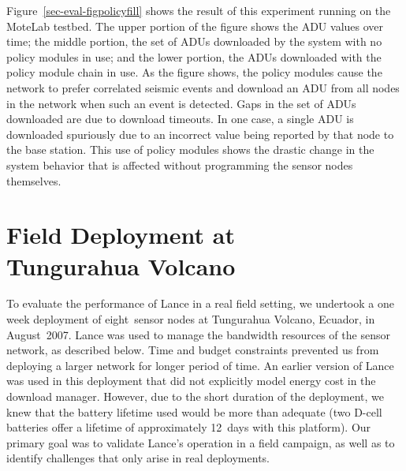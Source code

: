 \documentclass[lettersize]{sig-alternate-konrad}
\begin{document}
Figure~\ref{sec-eval-figpolicyfill} shows the result of this
experiment running on the MoteLab testbed. The upper portion of the
figure shows the ADU values over time; the middle portion, the set of ADUs
downloaded by the system with no policy modules in use; and the lower
portion, the ADUs downloaded with the policy module chain in use.
As the figure shows, the policy modules cause the network to prefer 
correlated seismic events and download an ADU from all nodes in
the network when such an event is detected. Gaps in the set of ADUs
downloaded are due to download timeouts. In one case, a single ADU 
is downloaded spuriously due to an incorrect value being reported by
that node to the base station. This use of policy modules shows the
drastic change in the system behavior that is affected without
programming the sensor nodes themselves.

\pagebreak
\section{Field Deployment at\\Tungurahua Volcano}
\label{sec-deploy}
\label{sec-deployment}

To evaluate the performance of Lance in a real field setting, 
we undertook a one week deployment of eight~sensor nodes at
Tungurahua Volcano, Ecuador, in August~2007. Lance was used to manage
the bandwidth resources of the sensor network, as
described below. Time and budget constraints prevented us from deploying 
a larger network for longer period of time. 
An earlier version of Lance was used in this deployment
that did not explicitly model energy cost in the download manager. 
However, due to the short duration of the deployment, we knew that 
the battery lifetime used would be more than adequate (two D-cell batteries
offer a lifetime of approximately 12~days with this platform). 
Our primary goal was to validate Lance's operation in a field campaign, 
as well as to identify challenges that only arise in real deployments.
\end{document}
